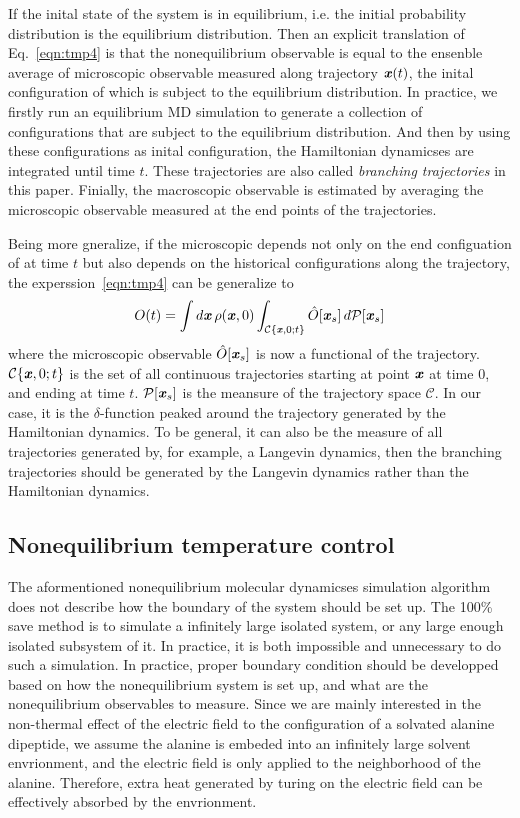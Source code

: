 \documentclass[aip,jcp,a4paper,preprint,onecolumn]{revtex4-1}
\newcommand{\vect}[1]{\textbf{\textit{#1}}}
\begin{document}
If the inital state of the system is in equilibrium, i.e. the initial
probability distribution is the equilibrium distribution. Then an
explicit translation of Eq.~\eqref{eqn:tmp4} is that the
nonequilibrium observable is equal to the ensenble average of
microscopic observable measured along trajectory $\vect x(t)$, the
inital configuration of which is subject to the equilibrium
distribution. In practice, we firstly run an equilibrium MD simulation
to generate a collection of configurations that are subject to the
equilibrium distribution. And then by using these configurations as
inital configuration, the Hamiltonian dynamicses are integrated until
time $t$. These trajectories are also called \emph{branching
  trajectories} in this paper. Finially, the macroscopic observable is
estimated by averaging the microscopic observable measured at the end
points of the trajectories.

Being more gneralize, if the microscopic depends not only on the end
configuation of at time $t$ but also depends on the historical
configurations along the trajectory, the experssion~\eqref{eqn:tmp4} can be generalize to
\begin{align}
  O(t) = \int d\vect x\,\rho(\vect x, 0) \int_{\mathcal C\{\vect x, 0; t\}} \hat O[\vect x_s] \,d\mathcal P[\vect x_s] 
\end{align}
where the microscopic observable $ \hat O[\vect x_s] $ is now a
functional of the trajectory.  $\mathcal C\{\vect x, 0; t\}$ is the
set of all continuous trajectories starting at point $\vect x$ at time
0, and ending at time $t$. $\mathcal P[\vect x_s] $ is the meansure of
the trajectory space $\mathcal C$.  In our case, it is the
$\delta$-function peaked around the trajectory generated by the
Hamiltonian dynamics. To be general, it can also be the measure of all
trajectories generated by, for example, a Langevin dynamics, then the
branching trajectories should be generated by the Langevin
dynamics rather than the Hamiltonian dynamics.


\subsection{Nonequilibrium temperature control}

The aformentioned nonequilibrium molecular dynamicses simulation algorithm
does not describe how the boundary of the system should be set up. The 100\% save
method is to simulate a infinitely large isolated system, or any large enough
isolated subsystem of it. In practice, it is both impossible and unnecessary to
do such a simulation. In practice, proper boundary condition should be developped
based on how the nonequilibrium system is set up, and what are the nonequilibrium
observables to measure.
Since we are mainly interested in the non-thermal effect of
the electric field to the configuration of a solvated alanine dipeptide,
we assume the alanine is embeded into an infinitely large solvent envrionment,
and the electric field is only applied to the neighborhood of the alanine. Therefore, 
extra heat generated by turing on the electric field can be effectively absorbed
by the envrionment. 
\end{document}
